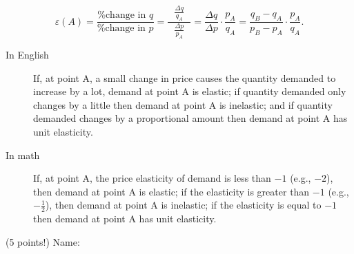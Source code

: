 \documentclass{article}
\begin{document}
\begin{EXAM}
\begin{itemize}
\[
\varepsilon (A)=\frac{\mbox{\% change in } q}{\mbox{\% change in } p} = \displaystyle\frac{\ \ \ \displaystyle\frac{\Delta q}{q_A}\ \ \ }{\displaystyle\frac{\Delta p}{p_A}} =
\frac{\Delta q}{\Delta p}\cdot\frac{p_A}{q_A} =
\frac{q_B-q_A}{p_B-p_A}\cdot\frac{p_A}{q_A}.
\]

\enlargethispage{2\baselineskip}

\begin{description}

\item [In English] If, at point A, a small change in price causes
the quantity demanded to increase by a lot, demand at point A is
elastic; if quantity demanded only changes by a little then demand
at point A is inelastic; and if quantity demanded changes by a
proportional amount then demand at point A has unit elasticity.

\item [In math] If, at point A, the price elasticity of demand is
less than $-1$ (e.g., $-2$), then demand at point A is elastic; if
the elasticity is greater than $-1$ (e.g., $-\frac{1}{2}$), then
demand at point A is inelastic; if the elasticity is equal to $-1$
then demand at point A has unit elasticity.

\end{description}


\end{itemize}

\clearpage


\vspace*{-3cm}

\begin{flushright}
(5 points!) Name: \hspace*{1in}
\end{flushright}

\bigskip


\end{EXAM} 
\end{document}
